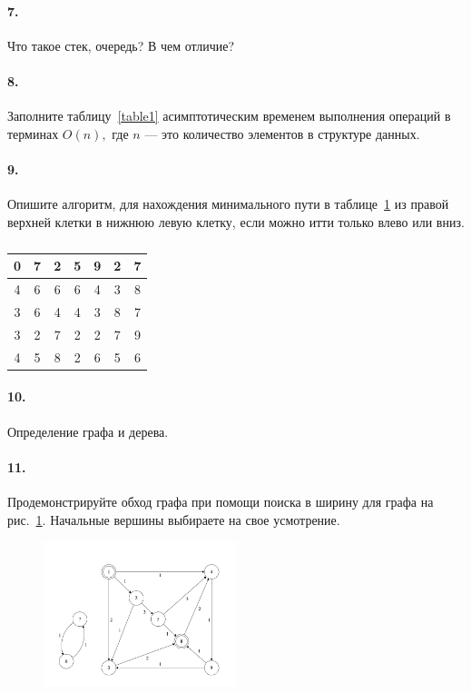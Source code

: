 \documentclass[12pt, twoside]{article}
\begin{document}
\paragraph{7.} Что такое стек, очередь? В чем отличие?

\paragraph{8.} Заполните таблицу~\ref{table1} асимптотическим временем выполнения операций в терминах $O\left(n\right),$ где $n$ --- это количество элементов в структуре данных. 

\paragraph{9.} Опишите алгоритм, для нахождения минимального пути в таблице~\ref{table2} из правой верхней клетки в нижнюю левую клетку, если можно итти только влево или вниз.

\begin{table}[h!]
\begin{center}
\caption{}
\label{table2}
\begin{tabular}{|c|c|c|c|c|c|c|}
\hline
0	&7	&2	&5	&9	&2	&7\\
\hline
4	&6	&6	&6	&4	&3	&8\\
\hline
3	&6	&4	&4	&3	&8	&7\\
\hline
3	&2	&7	&2	&2	&7	&9\\
\hline
4	&5	&8	&2	&6	&5	&6\\
\hline
\end{tabular}
\end{center}
\end{table}


\paragraph{10.} Определение графа и дерева.

\paragraph{11.} Продемонстрируйте обход графа при помощи поиска в ширину для графа на рис.~\ref{fig1}. Начальные вершины выбираете на свое усмотрение.


\begin{figure}[h!t]\center
\includegraphics[width=0.5\textwidth]{1}
\caption{}
\label{fig1}
\end{figure}
\end{document}
